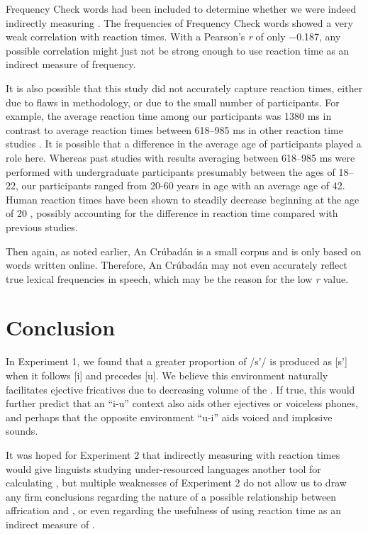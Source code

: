 \documentclass[output=paper
,newtxmath
,modfonts
,nonflat]{langsci/langscibook}
\begin{document}
Frequency Check words had been included to determine whether we were indeed indirectly measuring . The frequencies of Frequency Check words showed a very weak correlation with reaction times. With a Pearson’s \textit{r} of only −0.187, any possible correlation might just not be strong enough to use reaction time as an indirect measure of frequency. 

It is also possible that this study did not accurately capture reaction times, either due to flaws in methodology, or due to the small number of participants. For example, the average reaction time among our participants was 1380 ms in contrast to average reaction times between 618–985 ms in other reaction time studies \citep{brysbaert2011word}. It is possible that a difference in the average age of participants played a role here. Whereas past studies with results averaging between 618–985 ms were performed with undergraduate participants presumably between the ages of 18–22, our participants ranged from 20-60 years in age with an average age of 42. Human reaction times have been shown to steadily decrease beginning at the age of 20 \citep{pierson1958movement}, possibly accounting for the difference in reaction time compared with previous studies.

Then again, as noted earlier, An Crúbadán is a small corpus and is only based on words written online. Therefore, An Crúbadán may not even accurately reflect true lexical frequencies in speech, which may be the reason for the low \textit{r} value.

\section{Conclusion}\label{sec:moeng:7}

In Experiment 1, we found that a greater proportion of /s’/ is produced as [s’] when it follows [i] and precedes [u]. We believe this environment naturally facilitates ejective fricatives due to decreasing volume of the . If true, this would further predict that an “i-u” context also aids other ejectives or voiceless phones, and perhaps that the opposite environment “u-i” aids voiced and implosive sounds.

It was hoped for Experiment 2 that indirectly measuring  with reaction times would give linguists studying under-resourced languages another tool for calculating , but multiple weaknesses of Experiment 2 do not allow us to draw any firm conclusions regarding the nature of a possible relationship between affrication and , or even regarding the usefulness of using reaction time as an indirect measure of . 
\end{document}
